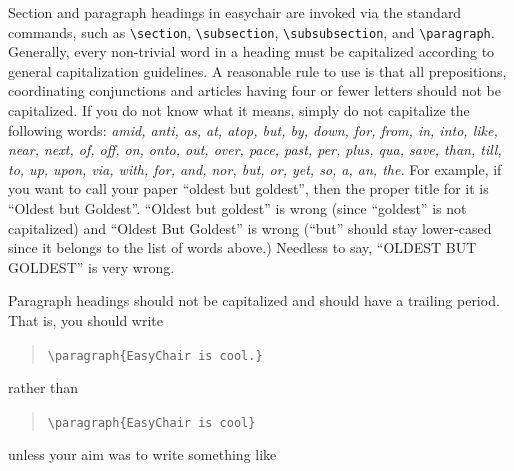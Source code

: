 \documentclass{easychair}
\newcommand{\easychair}{\textsf{easychair}}
\begin{document}
Section and paragraph headings in {\easychair} are invoked via the standard 
commands, such as
\verb+\section+,
\verb+\subsection+,
\verb+\subsubsection+, and
\verb+\paragraph+.
Generally, every non-trivial word in a heading must be capitalized according to
general capitalization guidelines. A reasonable rule to use is that
all prepositions, coordinating conjunctions and articles having four
or fewer letters should not be capitalized. If you do not know what it
means, simply do not capitalize the following words:
\textit{amid, anti, as, at, atop, but, by, down, for, from, in, into, like,
near, next, of, off, on, onto, out, over, pace, past, per, plus, qua,
save, than, till, to, up, upon, via, with, for, and, nor, but, or,
yet, so, a, an, the.} For example, if you want to call your paper
``oldest but goldest'', then the proper title for it is ``Oldest but
Goldest''. ``Oldest but goldest'' is wrong (since ``goldest'' is not
capitalized) and ``Oldest But Goldest'' is wrong (``but'' should stay
lower-cased since it belongs to the list of words above.) Needless to
say, ``OLDEST BUT GOLDEST'' is very wrong.

Paragraph headings should not be capitalized and should have a
trailing period. That is, you should write

\begin{quote}
\verb|\paragraph{EasyChair is cool.}|
\end{quote}
rather than 

\begin{quote}
\verb|\paragraph{EasyChair is cool}|
\end{quote}
unless your aim was to write something like
\end{document}
